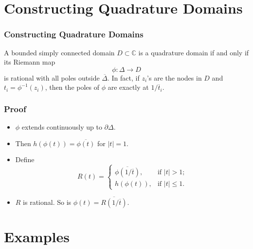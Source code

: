 \documentclass{beamer}
\begin{document}

\section{Constructing Quadrature Domains}

\begin{frame}
 \frametitle{Constructing Quadrature Domains}

\begin{theorem}

A bounded simply connected domain $D \subset \mathbb C$ is a quadrature domain if and only if its Riemann map 
\[
\phi : \Delta \rightarrow D
\]
is rational with all poles outside $\overline \Delta$. In fact, if $z_i$'s are the nodes in $D$ and $t_i = \phi^{-1}(z_i)$, then the poles of $\phi$ are exactly at $1/\overline t_i$.

\end{theorem}

\end{frame}


\begin{frame}
 \frametitle{Proof}

\begin{itemize}
 
 \item $\phi$ extends continuously up to $\partial \Delta$.

 \item Then $h(\phi(t)) = \overline{\phi(t)}$ for $\vert t \vert = 1$. 

 \item Define 
\[
R(t) =
 \begin{cases}
  \overline{\phi(1/\overline{t})}, &\text{if $\vert t \vert > 1$;}\\ 
  h(\phi(t)),                      &\text{if $\vert t \vert \le 1$.}     
 \end{cases}
\]

 \item $R$ is rational. So is $\phi(t) = \overline{R(1/\overline{t})}$. 

\end{itemize}

\end{frame}


\section{Examples}
\end{document}
